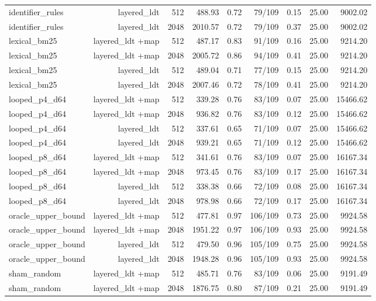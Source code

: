 \begin{table}[t]
\begin{adjustbox}{max width=\linewidth}
\begin{tabular}{lrrrrrrrr}
identifier\_rules & layered\_ldt & 512 & 488.93 & 0.72 & 79/109 & 0.15 & 25.00 & 9002.02 \\
identifier\_rules & layered\_ldt & 2048 & 2010.57 & 0.72 & 79/109 & 0.37 & 25.00 & 9002.02 \\
lexical\_bm25 & layered\_ldt +map & 512 & 487.17 & 0.83 & 91/109 & 0.16 & 25.00 & 9214.20 \\
lexical\_bm25 & layered\_ldt +map & 2048 & 2005.72 & 0.86 & 94/109 & 0.41 & 25.00 & 9214.20 \\
lexical\_bm25 & layered\_ldt & 512 & 489.04 & 0.71 & 77/109 & 0.15 & 25.00 & 9214.20 \\
lexical\_bm25 & layered\_ldt & 2048 & 2007.46 & 0.72 & 78/109 & 0.41 & 25.00 & 9214.20 \\
looped\_p4\_d64 & layered\_ldt +map & 512 & 339.28 & 0.76 & 83/109 & 0.07 & 25.00 & 15466.62 \\
looped\_p4\_d64 & layered\_ldt +map & 2048 & 936.82 & 0.76 & 83/109 & 0.12 & 25.00 & 15466.62 \\
looped\_p4\_d64 & layered\_ldt & 512 & 337.61 & 0.65 & 71/109 & 0.07 & 25.00 & 15466.62 \\
looped\_p4\_d64 & layered\_ldt & 2048 & 939.21 & 0.65 & 71/109 & 0.12 & 25.00 & 15466.62 \\
looped\_p8\_d64 & layered\_ldt +map & 512 & 341.61 & 0.76 & 83/109 & 0.07 & 25.00 & 16167.34 \\
looped\_p8\_d64 & layered\_ldt +map & 2048 & 973.45 & 0.76 & 83/109 & 0.17 & 25.00 & 16167.34 \\
looped\_p8\_d64 & layered\_ldt & 512 & 338.38 & 0.66 & 72/109 & 0.08 & 25.00 & 16167.34 \\
looped\_p8\_d64 & layered\_ldt & 2048 & 978.98 & 0.66 & 72/109 & 0.17 & 25.00 & 16167.34 \\
oracle\_upper\_bound & layered\_ldt +map & 512 & 477.81 & 0.97 & 106/109 & 0.73 & 25.00 & 9924.58 \\
oracle\_upper\_bound & layered\_ldt +map & 2048 & 1951.22 & 0.97 & 106/109 & 0.93 & 25.00 & 9924.58 \\
oracle\_upper\_bound & layered\_ldt & 512 & 479.50 & 0.96 & 105/109 & 0.75 & 25.00 & 9924.58 \\
oracle\_upper\_bound & layered\_ldt & 2048 & 1948.28 & 0.96 & 105/109 & 0.93 & 25.00 & 9924.58 \\
sham\_random & layered\_ldt +map & 512 & 485.71 & 0.76 & 83/109 & 0.06 & 25.00 & 9191.49 \\
sham\_random & layered\_ldt +map & 2048 & 1876.75 & 0.80 & 87/109 & 0.21 & 25.00 & 9191.49 \\

\end{tabular}
\end{adjustbox}
\end{table}
